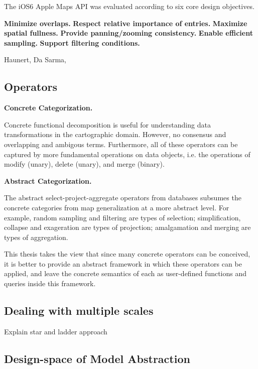 \documentclass[11pt, oneside]{report}
\newcommand{\minisec}[1]{\noindent\textbf{#1.}}
\begin{document}
The iOS6 Apple Maps API was evaluated 	according to six core design objectives.

\minisec{Minimize overlaps}
\minisec{Respect relative importance of entries}
\minisec{Maximize spatial fullness}
\minisec{Provide panning/zooming consistency}
\minisec{Enable efficient sampling}
\minisec{Support filtering conditions}


Haunert, Da Sarma, 

\subsection{Operators}

\minisec{Concrete Categorization}

Concrete functional decomposition is useful for understanding data transformations in the cartographic domain.  However, no consensus and overlapping and ambigous terms. Furthermore, all of these operators can be captured by more fundamental operations on data objects, i.e. the operations of modify (unary), delete (unary), and merge (binary).

\minisec{Abstract Categorization}

The abstract select-project-aggregate operators from databases subsumes the concrete categories from map generalization at a more abstract level. For example, random sampling and filtering are types of selection; simplification, collapse and exageration are types of projection; amalgamation and merging are types of aggregation.

This thesis takes the view that since many concrete operators can be conceived, it is better to provide an abstract framework in which these operators can be applied, and leave the concrete semantics of each as user-defined functions and queries inside this framework.



\subsection{Dealing with multiple scales}

Explain star and ladder approach~\cite{foerster2010challenges,sarma2012fusiontables}

\subsection{Design-space of Model Abstraction}
\end{document}
